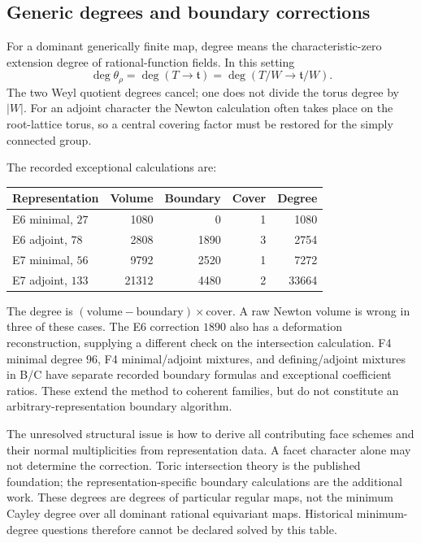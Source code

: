 \subsection{Generic degrees and boundary corrections}
For a dominant generically finite map, degree means the characteristic-zero extension degree of rational-function fields. In this setting
\[
 \deg\theta_\rho=\deg(T\to\mathfrak t)=\deg(T/W\to\mathfrak t/W).
\]
The two Weyl quotient degrees cancel; one does not divide the torus degree by $|W|$. For an adjoint character the Newton calculation often takes place on the root-lattice torus, so a central covering factor must be restored for the simply connected group.

The recorded exceptional calculations are:
\begin{center}
\begin{tabular}{lrrrr}
\toprule
Representation & Volume & Boundary & Cover & Degree\\\midrule
E6 minimal, $27$ &1080&0&1&1080\\
E6 adjoint, $78$ &2808&1890&3&2754\\
E7 minimal, $56$ &9792&2520&1&7272\\
E7 adjoint, $133$ &21312&4480&2&33664\\\bottomrule
\end{tabular}
\end{center}
The degree is $(\text{volume}-\text{boundary})\times\text{cover}$. A raw Newton volume is wrong in three of these cases. The E6 correction $1890$ also has a deformation reconstruction, supplying a different check on the intersection calculation. F4 minimal degree $96$, F4 minimal/adjoint mixtures, and defining/adjoint mixtures in B/C have separate recorded boundary formulas and exceptional coefficient ratios. These extend the method to coherent families, but do not constitute an arbitrary-representation boundary algorithm.

The unresolved structural issue is how to derive all contributing face schemes and their normal multiplicities from representation data. A facet character alone may not determine the correction. Toric intersection theory is the published foundation; the representation-specific boundary calculations are the additional work. These degrees are degrees of particular regular maps, not the minimum Cayley degree over all dominant rational equivariant maps. Historical minimum-degree questions therefore cannot be declared solved by this table.



